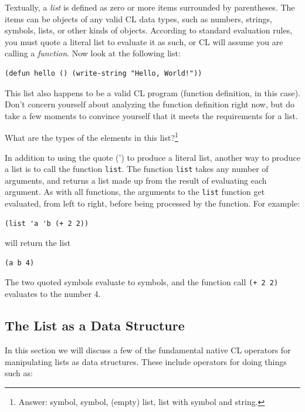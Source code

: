 \documentclass [11pt]{book}
\begin{document}
Textually, a \emph{list} is defined as zero or more items surrounded by
parentheses. The items can be objects of any valid CL data types, such
as numbers, strings, symbols, lists, or other kinds of
objects. According to standard evaluation rules, you must quote a
literal list to evaluate it as such, or CL will assume you are calling
a \emph{function}. Now look at the following list:

\begin{verbatim}(defun hello () (write-string "Hello, World!"))
\end{verbatim}This list also happens to be a valid CL program (function definition,
in this case). Don't concern yourself about analyzing the function definition
right now, but do take a few moments to convince yourself that it
meets the requirements for a list.



What are the types of the elements in this list?\footnote{Answer: symbol, symbol, (empty) list, list with symbol and string.}



In addition to using the quote (') to produce a literal list, another
way to produce a list is to call the function \texttt{list}. The function \texttt{list} takes any number of arguments, and returns a list made up
from the result of evaluating each argument. As with all functions,
the arguments to the \texttt{list} function get evaluated, from left to right, before being
processed by the function. For example:

\begin{verbatim}(list 'a 'b (+ 2 2))
\end{verbatim}will return the list

\begin{verbatim}(a b 4)
\end{verbatim}The two quoted symbols evaluate to symbols, and the function
call \texttt{(+ 2 2)} evaluates to the number 4.



\subsection{The List as a Data Structure}

\label{subsec:thelistasadatastructure}

In this section we will discuss a few of the fundamental native
CL operators for manipulating lists as data structures. These include
operators for doing things such as:
\end{document}
